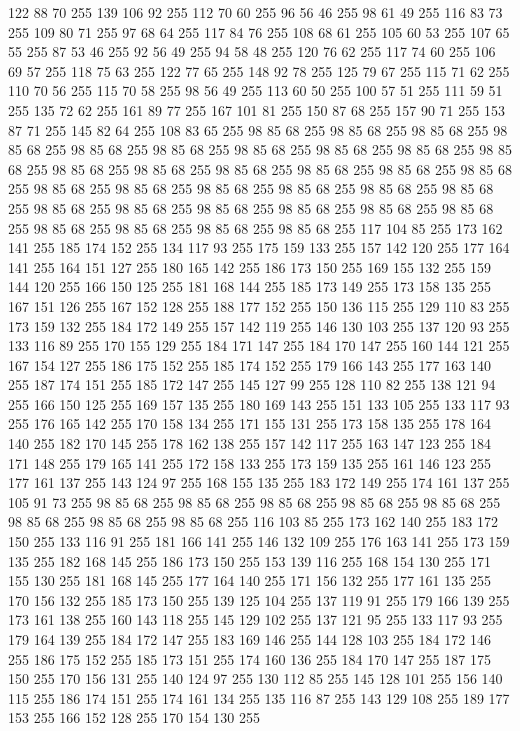 122 88 70 255 139 106 92 255 112 70 60 255 96 56 46 255 98 61 49 255 116 83 73 255 109 80 71 255 97 68 64 255 117 84 76 255 108 68 61 255 105 60 53 255 107 65 55 255 87 53 46 255 92 56 49 255 94 58 48 255 120 76 62 255 117 74 60 255 106 69 57 255 118 75 63 255 122 77 65 255 148 92 78 255 125 79 67 255 115 71 62 255 110 70 56 255 115 70 58 255 98 56 49 255 113 60 50 255 100 57 51 255 111 59 51 255 135 72 62 255 161 89 77 255 167 101 81 255 150 87 68 255 157 90 71 255 153 87 71 255 145 82 64 255 108 83 65 255 98 85 68 255 98 85 68 255 98 85 68 255 98 85 68 255 98 85 68 255 98 85 68 255 98 85 68 255 98 85 68 255 98 85 68 255 98 85 68 255 98 85 68 255 98 85 68 255 98 85 68 255 98 85 68 255 98 85 68 255 98 85 68 255 98 85 68 255 98 85 68 255 98 85 68 255 98 85 68 255 98 85 68 255 98 85 68 255 98 85 68 255 98 85 68 255 98 85 68 255 98 85 68 255 98 85 68 255
98 85 68 255 98 85 68 255 98 85 68 255 98 85 68 255 98 85 68 255 117 104 85 255 173 162 141 255 185 174 152 255 134 117 93 255 175 159 133 255 157 142 120 255 177 164 141 255 164 151 127 255 180 165 142 255 186 173 150 255 169 155 132 255 159 144 120 255 166 150 125 255 181 168 144 255 185 173 149 255 173 158 135 255 167 151 126 255 167 152 128 255 188 177 152 255 150 136 115 255 129 110 83 255 173 159 132 255 184 172 149 255 157 142 119 255 146 130 103 255 137 120 93 255 133 116 89 255 170 155 129 255 184 171 147 255 184 170 147 255 160 144 121 255 167 154 127 255 186 175 152 255 185 174 152 255 179 166 143 255 177 163 140 255 187 174 151 255 185 172 147 255 145 127 99 255 128 110 82 255 138 121 94 255 166 150 125 255 169 157 135 255 180 169 143 255 151 133 105 255 133 117 93 255 176 165 142 255 170 158 134 255 171 155 131 255 173 158 135 255 178 164 140 255 182 170 145 255 178 162 138 255 157 142 117 255 163 147 123 255 184 171 148 255 179 165 141 255 172 158 133 255 173 159 135 255
161 146 123 255 177 161 137 255 143 124 97 255 168 155 135 255 183 172 149 255 174 161 137 255 105 91 73 255 98 85 68 255 98 85 68 255 98 85 68 255 98 85 68 255 98 85 68 255 98 85 68 255 98 85 68 255 98 85 68 255 116 103 85 255 173 162 140 255 183 172 150 255 133 116 91 255 181 166 141 255 146 132 109 255 176 163 141 255 173 159 135 255 182 168 145 255 186 173 150 255 153 139 116 255 168 154 130 255 171 155 130 255 181 168 145 255 177 164 140 255 171 156 132 255 177 161 135 255 170 156 132 255 185 173 150 255 139 125 104 255 137 119 91 255 179 166 139 255 173 161 138 255 160 143 118 255 145 129 102 255 137 121 95 255 133 117 93 255 179 164 139 255 184 172 147 255 183 169 146 255 144 128 103 255 184 172 146 255 186 175 152 255 185 173 151 255 174 160 136 255 184 170 147 255 187 175 150 255 170 156 131 255 140 124 97 255 130 112 85 255 145 128 101 255 156 140 115 255 186 174 151 255 174 161 134 255 135 116 87 255 143 129 108 255 189 177 153 255 166 152 128 255 170 154 130 255
